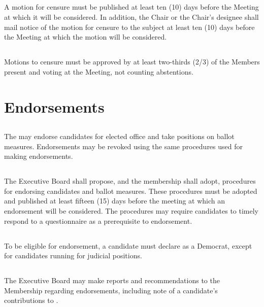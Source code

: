 \subsection{}
A motion for censure must be published at least ten (10) days before the Meeting at which it will be considered. In addition, the Chair or the Chair’s designee shall mail notice of the motion for censure to the subject at least ten (10) days before the Meeting at which the motion will be considered.

\subsection{}
Motions to censure must be approved by at least two-thirds (2/3) of the Members present and voting at the Meeting, not counting abstentions.

\section{Endorsements}
\subsection{}
The \district{} may endorse candidates for elected office and take positions on ballot measures.  Endorsements may be revoked using the same procedures used for making endorsements.

\subsection{} \label{endorsement-procedures}
The Executive Board shall propose, and the membership shall adopt, procedures for endorsing candidates and ballot measures. These procedures must be adopted and published at least fifteen (15) days before the meeting at which an endorsement will be considered. The procedures may require candidates to timely respond to a questionnaire as a prerequisite to endorsement.

\subsection{}
To be eligible for endorsement, a candidate must declare as a Democrat, except for candidates running for judicial positions.

\subsection{}
The Executive Board may make reports and recommendations to the Membership regarding endorsements, including note of a candidate’s contributions to \thedistrict{}.

